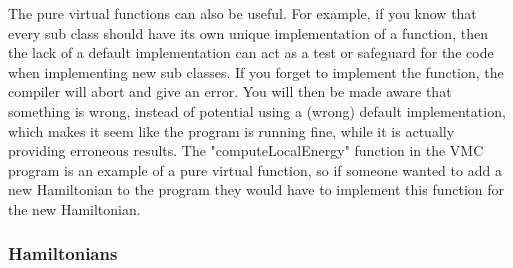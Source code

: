 \documentclass[../main.tex]{subfiles}
\begin{document}
The pure virtual functions can also be useful. For example, if you know that every sub class should have its own unique implementation of a function, then the lack of a default implementation can act as a test or safeguard for the code when implementing new sub classes. If you forget to implement the function, the compiler will abort and give an error. You will then be made aware that something is wrong, instead of potential using a (wrong) default implementation, which makes it seem like the program is running fine, while it is actually providing erroneous results. The "computeLocalEnergy" function in the VMC program is an example of a pure virtual function, so if someone wanted to add a new Hamiltonian to the program they would have to implement this function for the new Hamiltonian.

\subsubsection{Hamiltonians}\label{sec:Hamiltonians}
\end{document}
